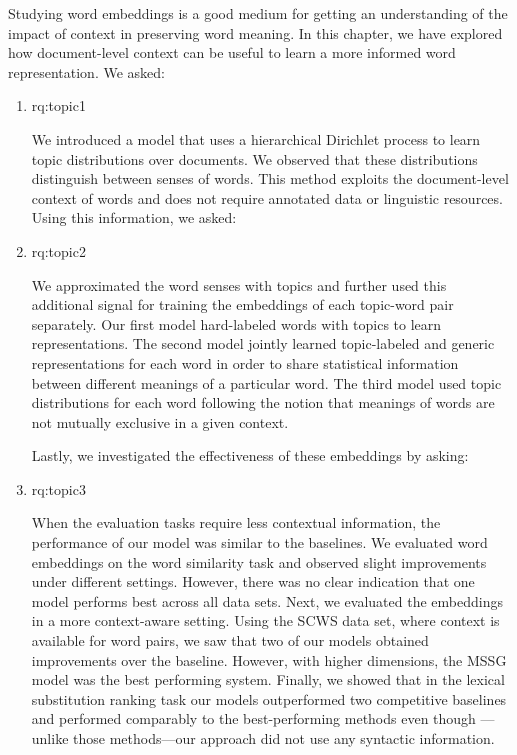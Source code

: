 Studying word embeddings is a good medium for getting an understanding of the impact of context in preserving word meaning.
In this chapter, we have explored how document-level context can be useful to learn a more informed word representation.
We asked:  

\begin{enumerate}[label=\textbf{RQ1.\arabic* },wide = 0pt, leftmargin=2em]
\setlength\itemsep{1em}
 \setcounter{enumi}{0}
\item \acl{rq:topic1}

\medskip

\noindent We introduced a model that uses a hierarchical Dirichlet process to learn topic distributions over documents. 
We observed that these distributions distinguish between senses of words. 
 This method exploits the document-level context of words and does not require annotated data or linguistic resources. 
Using this information, we asked:

\item \acl{rq:topic2}

\medskip

\noindent We approximated the word senses with topics and further used this additional signal for training the embeddings of each topic-word pair separately. 
Our first model hard-labeled words with topics to learn representations. The second model jointly learned topic-labeled and generic representations for each word in order to share statistical information between different meanings of a particular word. 
The third model used topic distributions for each word following the notion that meanings of words are not mutually exclusive in a given context.

 \noindent  Lastly, we investigated the effectiveness of these embeddings by asking:

\item \acl{rq:topic3}

\medskip

\noindent 
When the evaluation tasks require less contextual information, the performance of our model was similar to the baselines.
 We evaluated word embeddings on the word similarity task and observed slight improvements under different settings. 
However, there was no clear indication that one model performs best across all data sets. 
Next, we evaluated the embeddings in a more context-aware setting.
Using the SCWS data set, where context is available for word pairs, we saw that two of our models obtained improvements over the baseline. 
However, with higher dimensions, the MSSG model \citep{neelakantan2014efficient} was the best performing system. 
Finally, we showed that in the lexical substitution ranking task \citep{mccarthy2007semeval} 
our models outperformed two competitive baselines and performed comparably to the best-performing methods even though ---unlike those methods---our approach did not use any syntactic information. 

\end{enumerate}

